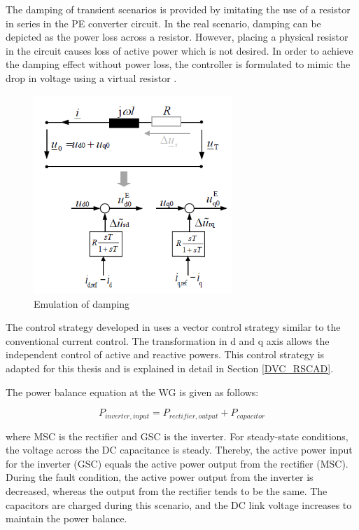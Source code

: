 The damping of transient scenarios is provided by imitating the use of a resistor in series in the \gls{PE} converter circuit. In the real scenario, damping can be depicted as the power loss across a resistor. However, placing a physical resistor in the circuit causes loss of active power which is not desired. In order to achieve the damping effect without power loss, the controller is formulated to mimic the drop in voltage using a virtual resistor \cite{erlich_new_2017}.  

\begin{figure}[H]
\centering
    \includegraphics[height = 7.5cm,width = 7.5cm]{Diagrams/Chapter_2/Diss_washout_control.PNG}
    \caption{Emulation of damping \cite{erlich_new_2017}}
    \label{fig:Diss_washout_control}
\end{figure}

The control strategy developed in \cite{korai_dynamic_2019} uses a vector control strategy similar to the conventional current control. The transformation in d and q axis allows the independent control of active and reactive powers. This control strategy is adapted for this thesis and is explained in detail in Section \ref{DVC_RSCAD}. 

The power balance equation at the \gls{WG} is given as follows:

\begin{equation}\label{powbaleq}
    P_{inverter,input} = P_{rectifier,output} + P_{capacitor}  
\end{equation}

where \gls{MSC} is the rectifier and \gls{GSC} is the inverter. For steady-state conditions, the voltage across the \gls{DC} capacitance is steady. Thereby, the active power input for the inverter (\gls{GSC}) equals the active power output from the rectifier (\gls{MSC}). During the fault condition, the active power output from the inverter is decreased, whereas the output from the rectifier tends to be the same. The capacitors are charged during this scenario, and the \gls{DC} link voltage increases to maintain the power balance. 


